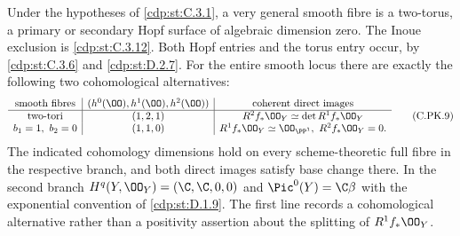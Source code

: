 
\begin{proposition}\label{cdp:st:C.3.11}

Under the hypotheses of \ref{cdp:st:C.3.1}, a very general smooth fibre
is a two-torus, a primary or secondary Hopf surface of
algebraic dimension zero. The Inoue exclusion is \ref{cdp:st:C.3.12}.
Both Hopf
entries and the torus entry occur, by \ref{cdp:st:C.3.6} and \ref{cdp:st:D.2.7}.
For the entire smooth locus there are exactly the following
two cohomological alternatives:
\[
\begin{array}{c|c|c}
\text{smooth fibres}&
 (h^0(\OO),h^1(\OO),h^2(\OO))&
 \text{coherent direct images}\\ \hline
\text{two-tori}&(1,2,1)&
 R^2f_*\OO_Y\simeq\det R^1f_*\OO_Y\\
b_1=1,\ b_2=0&(1,1,0)&
 R^1f_*\OO_Y\simeq\OO_{\PP^1},\
 R^2f_*\OO_Y=0 .
\end{array}
\tag{C.PK.9}\label{cdp:eq:C.PK.9}
\]
The indicated cohomology dimensions hold on every
scheme-theoretic full fibre in the respective branch,
and both direct images satisfy base change there.
In the second branch
$H^q(Y,\OO_Y)=(\C,\C,0,0)$ and
$\Pic^0(Y)=\C\beta$ with the exponential convention
of \ref{cdp:st:D.1.9}. The first line records a cohomological
alternative rather than a positivity assertion about
the splitting of $R^1f_*\OO_Y$.
\end{proposition}
